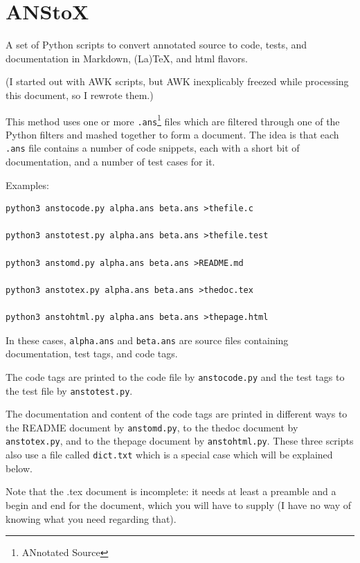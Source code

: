 
\part{ANStoX}
\label{anstox}

A set of Python scripts to convert annotated source to code, tests, and documentation in Markdown, (La)TeX, and html flavors.

(I started out with AWK scripts, but AWK inexplicably freezed while processing this document, so I rewrote them.)

This method uses one or more \texttt{.ans}\footnote{ANnotated Source} files which are filtered through one of the Python filters and mashed together to form a document. The idea is that each \texttt{.ans} file contains a number of code snippets, each with a short bit of documentation, and a number of test cases for it.

Examples:

\begin{verbatim}
python3 anstocode.py alpha.ans beta.ans >thefile.c

python3 anstotest.py alpha.ans beta.ans >thefile.test

python3 anstomd.py alpha.ans beta.ans >README.md

python3 anstotex.py alpha.ans beta.ans >thedoc.tex

python3 anstohtml.py alpha.ans beta.ans >thepage.html
\end{verbatim}

In these cases, \texttt{alpha.ans} and \texttt{beta.ans} are source files containing documentation, test tags, and code tags.

The code tags are printed to the code file by \texttt{anstocode.py} and the test tags to the test file by \texttt{anstotest.py}.

The documentation and content of the code tags are printed in different ways to the README document by \texttt{anstomd.py}, to the thedoc document by \texttt{anstotex.py}, and to the thepage document by \texttt{anstohtml.py}. These three scripts also use a file called \texttt{dict.txt} which is a special case which will be explained below.

\begin{pulledtext}

Note that the .tex document is incomplete: it needs at least a preamble and a begin and end for the document, which you will have to supply (I have no way of knowing what you need regarding that).
\end{pulledtext}

